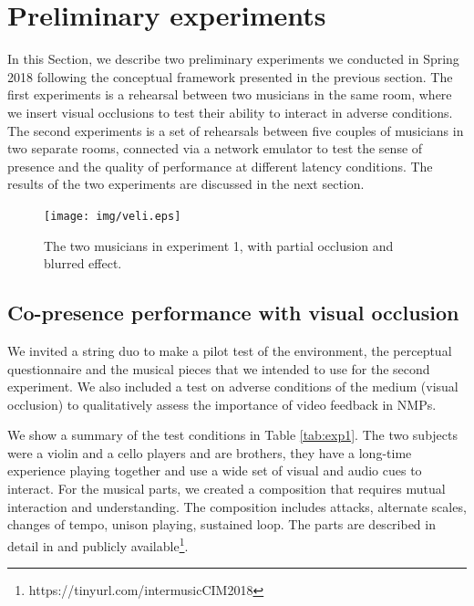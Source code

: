 

\section{Preliminary experiments}\label{sec:setup}
In this Section, we describe two preliminary experiments we conducted in Spring 2018 following the conceptual framework presented in the previous section. The first experiments is a rehearsal between two musicians in the same room, where we insert visual occlusions to test their ability to interact in adverse conditions. The second experiments is a set of rehearsals between five couples of musicians in two separate rooms, connected via a network emulator to test the sense of presence and the quality of performance at different latency conditions. The results of the two experiments are discussed in the next section.


\begin{figure}[t]
	\centering
	\texttt{[image: img/veli.eps]}
	\caption{The two musicians in experiment 1, with partial occlusion and blurred effect.}
	\label{fig:veli}
\end{figure}

\subsection{Co-presence performance with visual occlusion}
We invited a string duo to make a pilot test of the environment, the perceptual questionnaire and the musical pieces that we intended to use for the second experiment. We also included a test on adverse conditions of the medium (visual occlusion) to qualitatively assess the importance of video feedback in NMPs.

We show a summary of the test conditions in Table \ref{tab:exp1}. The two subjects were a violin and a cello players and are brothers, they have a long-time experience playing together and use a wide set of visual and audio cues to interact. For the musical parts, we created a composition that requires mutual interaction and understanding. The composition includes attacks, alternate scales, changes of tempo, unison playing, sustained loop. The parts are described in detail in \cite{CIM2018} and publicly available\footnote{https://tinyurl.com/intermusicCIM2018}.


